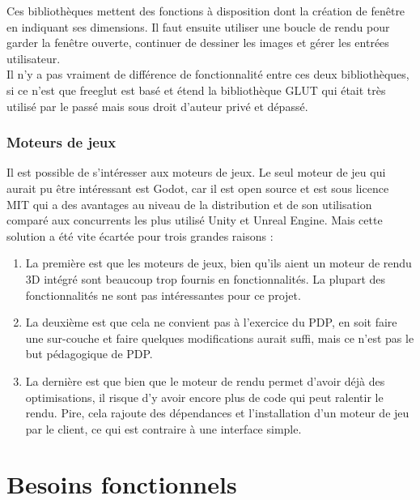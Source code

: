 \documentclass[a4paper]{article}
\begin{document}
    Ces bibliothèques mettent des fonctions à disposition dont la création de fenêtre en indiquant ses dimensions. Il faut ensuite utiliser une boucle de rendu pour garder la fenêtre ouverte, continuer de dessiner les images et gérer les entrées utilisateur.\\
    
    Il n'y a pas vraiment de différence de fonctionnalité entre ces deux bibliothèques, si ce n'est que freeglut est basé et étend la bibliothèque GLUT qui était très utilisé par le passé mais sous droit d'auteur privé et dépassé.
 
 \subsubsection{Moteurs de jeux}

    Il est possible de s'intéresser aux moteurs de jeux. Le seul moteur de jeu qui aurait pu être intéressant est Godot, car il est open source et est sous licence MIT qui a des avantages au niveau de la distribution et de son utilisation comparé aux concurrents les plus utilisé Unity et Unreal Engine. Mais cette solution a été vite écartée pour trois grandes raisons : 
    \begin{enumerate}
        \item  La première est que les moteurs de jeux, bien qu'ils aient un moteur de rendu 3D intégré sont beaucoup trop fournis en fonctionnalités. La plupart des fonctionnalités ne sont pas intéressantes pour ce projet. 
        
        \item La deuxième est que cela ne convient pas à l'exercice du PDP, en soit faire une sur-couche et faire quelques modifications aurait suffi, mais ce n'est pas le but pédagogique de PDP.
        
        \item  La dernière est que bien que le moteur de rendu permet d'avoir déjà des optimisations, il risque d'y avoir encore plus de code qui peut ralentir le rendu. Pire, cela rajoute des dépendances et l'installation d'un moteur de jeu par le client, ce qui est contraire à une interface simple.
    \end{enumerate}

\newpage
\section{Besoins fonctionnels}
\end{document}

